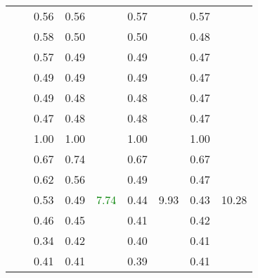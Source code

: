 \begin{table}
\begin{tabular}{ccccccccc}
		& & 0.56 & 0.56 & & 0.57 & & 0.57 & \\
		& & 0.58 & 0.50 & & 0.50 & & 0.48 & \\
		& & 0.57 & 0.49 & & 0.49 & & 0.47 & \\
		& & 0.49 & 0.49 & & 0.49 & & 0.47 & \\
		& & 0.49 & 0.48 & & 0.48 & & 0.47 & \\
		& & 0.47 & 0.48 & & 0.48 & & 0.47 & \\
		\cline{2-9}
		& \multirow{7}{*}{\rotatebox[origin=c]{90}{\ac{hcgm} - interface}}& 1.00 & 1.00 & \multirow{7}{*}{\textcolor{green}{7.74}} & 1.00 & \multirow{7}{*}{9.93} & 1.00 & \multirow{7}{*}{10.28} \\
		& & 0.67 & 0.74 & & 0.67 & & 0.67 & \\
		& & 0.62 & 0.56 & & 0.49 & & 0.47 & \\
		& & 0.53 & 0.49 & & 0.44 & & 0.43 & \\
		& & 0.46 & 0.45 & & 0.41 & & 0.42 & \\
		& & 0.34 & 0.42 & & 0.40 & & 0.41 & \\
		& & 0.41 & 0.41 & & 0.39 & & 0.41 & \\
		\bottomrule
	\end{tabular}
\end{table}

